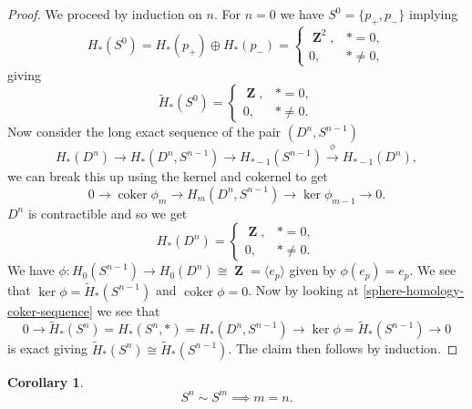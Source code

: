 \documentclass[10pt,]{book}
\theoremstyle{plain}
\newtheorem{corollary}[theorem]{Corollary}
\theoremstyle{definition}
\numberwithin{equation}{section}
\DeclareMathOperator{\coker}{coker}
\DeclareMathOperator{\ZZ}{\mathbf{Z}}
\begin{document}
\begin{proof}

              We proceed by induction on \(n\).
              For \(n = 0\) we have \(S^0 = \{p_+, p_-\}\) implying
              \[
                H_*(S^0) = H_*(p_+) \oplus H_*(p_-) = \begin{cases} \ZZ^2, &* = 0,\\0, &* \ne 0,\end{cases}
              \]
              giving
              \[
                \tilde H_*(S^0) = \begin{cases} \ZZ, &* = 0,\\0, &* \ne 0.\end{cases}
              \]
              Now consider the long exact sequence of the pair \((D^n, S^{n-1})\)\[
                H_*(D^n) \to H_*(D^n, S^{n-1}) \to H_{*-1}(S^{n-1}) \xrightarrow{\phi} H_{*-1}(D^n),
              \]
              we can break this up using the kernel and cokernel to get
              \begin{equation}
                0 \to \coker \phi_m \to H_m(D^n, S^{n-1}) \to \ker \phi_{m-1} \to 0.
              \label{sphere-homology-coker-sequence}\end{equation}\(D^n\) is contractible and so we get
              \[
                H_*(D^n) = \begin{cases} \ZZ, &* = 0,\\0, &* \ne 0.\end{cases}
              \]
              We have \(\phi\colon H_0(S^{n-1}) \to H_0(D^n) \cong \ZZ = \langle e_p\rangle\) given by \(\phi(e_p) = e_p\).
              We see that \(\ker \phi = \tilde H_*(S^{n-1})\) and \(\coker \phi = 0\).
              Now by looking at \eqref{sphere-homology-coker-sequence} we see that
              \[
                0 \to \tilde H_*(S^n) = H_*(S^n,*) = H_*(D^n, S^{n-1}) \to \ker\phi = \tilde H_*(S^{n-1}) \to 0
              \]
              is exact giving \(\tilde H_*(S^n) \cong \tilde H_*(S^{n-1})\).
              The claim then follows by induction.
            \end{proof}
\begin{corollary}\label{corollary-4}
\[
                S^n \sim S^m \implies m = n.
              \]\end{corollary}
\end{document}
